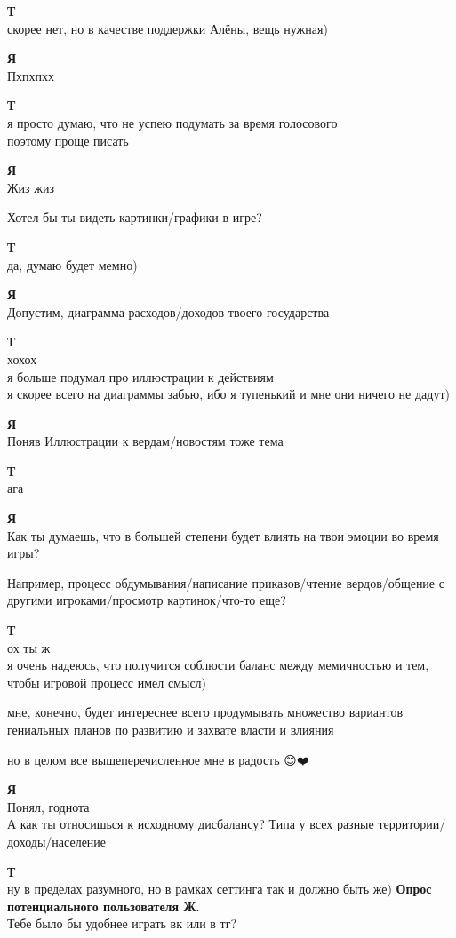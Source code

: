 \begin{tabbing}
\textbf{Т} \\
скорее нет, но в качестве поддержки Алёны, вещь нужная)

\textbf{Я} \\
Пхпхпхх

\textbf{Т} \\
я просто думаю, что не успею подумать за время голосового \\
поэтому проще писать

\textbf{Я} \\
Жиз жиз

Хотел бы ты видеть картинки/графики в игре?

\textbf{Т} \\
да, думаю будет мемно)

\textbf{Я} \\
Допустим, диаграмма расходов/доходов твоего государства

\textbf{Т} \\
хохох \\
я больше подумал про иллюстрации к действиям \\
я скорее всего на диаграммы забью, ибо я тупенький и мне они ничего не дадут)

\textbf{Я} \\
Поняв
Иллюстрации к вердам/новостям тоже тема

\textbf{Т} \\
ага

\textbf{Я} \\
Как ты думаешь, что в большей степени будет влиять на твои эмоции во время игры?

Например, процесс обдумывания/написание приказов/чтение вердов/общение с другими игроками/просмотр картинок/что-то еще?

\textbf{Т} \\
ох ты ж \\
я очень надеюсь, что получится соблюсти баланс между мемичностью и тем, чтобы игровой процесс имел смысл)

мне, конечно, будет интереснее всего продумывать множество вариантов гениальных планов по развитию и захвате власти и влияния

но в целом все вышеперечисленное мне в радость 😊❤️

\textbf{Я} \\
Понял, годнота \\
А как ты относишься к исходному дисбалансу? Типа у всех разные территории/доходы/население

\textbf{Т} \\
ну в пределах разумного, но в рамках сеттинга так и должно быть же)
\textbf{Опрос потенциального пользователя Ж.}\\
Тебе было бы удобнее играть вк или в тг?


\end{tabbing}
